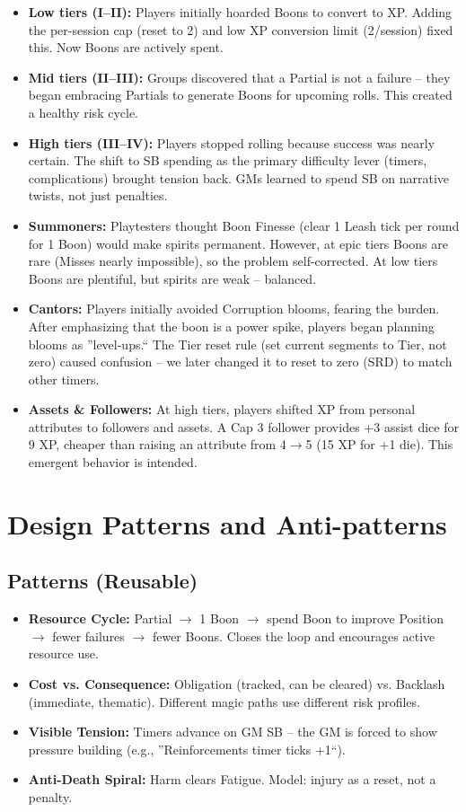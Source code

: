 \documentclass[11pt]{article}
\begin{document}
\begin{itemize}
    \item \textbf{Low tiers (I--II):} Players initially hoarded Boons to convert to XP. Adding the per-session cap (reset to 2) and low XP conversion limit (2/session) fixed this. Now Boons are actively spent.
    \item \textbf{Mid tiers (II--III):} Groups discovered that a Partial is not a failure -- they began embracing Partials to generate Boons for upcoming rolls. This created a healthy risk cycle.
    \item \textbf{High tiers (III--IV):} Players stopped rolling because success was nearly certain. The shift to SB spending as the primary difficulty lever (timers, complications) brought tension back. GMs learned to spend SB on narrative twists, not just penalties.
    \item \textbf{Summoners:} Playtesters thought Boon Finesse (clear 1 Leash tick per round for 1 Boon) would make spirits permanent. However, at epic tiers Boons are rare (Misses nearly impossible), so the problem self-corrected. At low tiers Boons are plentiful, but spirits are weak -- balanced.
    \item \textbf{Cantors:} Players initially avoided Corruption blooms, fearing the burden. After emphasizing that the boon is a power spike, players began planning blooms as ''level-ups.`` The Tier reset rule (set current segments to Tier, not zero) caused confusion -- we later changed it to reset to zero (SRD) to match other timers.
    \item \textbf{Assets \& Followers:} At high tiers, players shifted XP from personal attributes to followers and assets. A Cap 3 follower provides +3 assist dice for 9 XP, cheaper than raising an attribute from 4$\rightarrow$5 (15 XP for +1 die). This emergent behavior is intended.
\end{itemize}

\section{Design Patterns and Anti-patterns}
\label{sec:design-patterns}

\subsection{Patterns (Reusable)}
\begin{itemize}
    \item \textbf{Resource Cycle:} Partial $\rightarrow$ 1 Boon $\rightarrow$ spend Boon to improve Position $\rightarrow$ fewer failures $\rightarrow$ fewer Boons. Closes the loop and encourages active resource use.
    \item \textbf{Cost vs. Consequence:} Obligation (tracked, can be cleared) vs. Backlash (immediate, thematic). Different magic paths use different risk profiles.
    \item \textbf{Visible Tension:} Timers advance on GM SB -- the GM is forced to show pressure building (e.g., ''Reinforcements timer ticks +1``).
    \item \textbf{Anti-Death Spiral:} Harm clears Fatigue. Model: injury as a reset, not a penalty.
\end{itemize}
\end{document}
